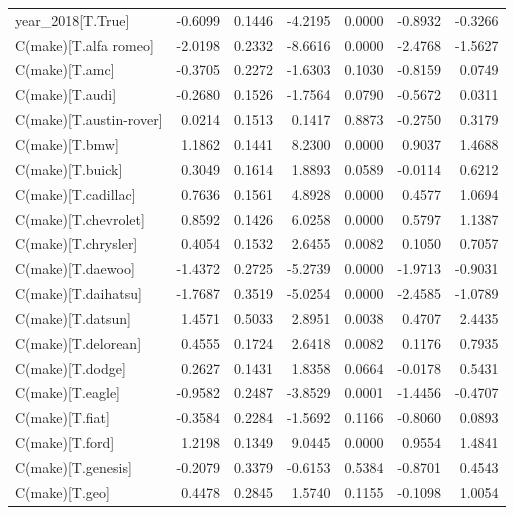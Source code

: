 \begin{table}
\begin{center}
\begin{tabular}{lrrrrrr}
year\_2018[T.True]       & -0.6099 &   0.1446 &  -4.2195 &      0.0000 & -0.8932 & -0.3266  \\
C(make)[T.alfa romeo]    & -2.0198 &   0.2332 &  -8.6616 &      0.0000 & -2.4768 & -1.5627  \\
C(make)[T.amc]           & -0.3705 &   0.2272 &  -1.6303 &      0.1030 & -0.8159 &  0.0749  \\
C(make)[T.audi]          & -0.2680 &   0.1526 &  -1.7564 &      0.0790 & -0.5672 &  0.0311  \\
C(make)[T.austin-rover]  &  0.0214 &   0.1513 &   0.1417 &      0.8873 & -0.2750 &  0.3179  \\
C(make)[T.bmw]           &  1.1862 &   0.1441 &   8.2300 &      0.0000 &  0.9037 &  1.4688  \\
C(make)[T.buick]         &  0.3049 &   0.1614 &   1.8893 &      0.0589 & -0.0114 &  0.6212  \\
C(make)[T.cadillac]      &  0.7636 &   0.1561 &   4.8928 &      0.0000 &  0.4577 &  1.0694  \\
C(make)[T.chevrolet]     &  0.8592 &   0.1426 &   6.0258 &      0.0000 &  0.5797 &  1.1387  \\
C(make)[T.chrysler]      &  0.4054 &   0.1532 &   2.6455 &      0.0082 &  0.1050 &  0.7057  \\
C(make)[T.daewoo]        & -1.4372 &   0.2725 &  -5.2739 &      0.0000 & -1.9713 & -0.9031  \\
C(make)[T.daihatsu]      & -1.7687 &   0.3519 &  -5.0254 &      0.0000 & -2.4585 & -1.0789  \\
C(make)[T.datsun]        &  1.4571 &   0.5033 &   2.8951 &      0.0038 &  0.4707 &  2.4435  \\
C(make)[T.delorean]      &  0.4555 &   0.1724 &   2.6418 &      0.0082 &  0.1176 &  0.7935  \\
C(make)[T.dodge]         &  0.2627 &   0.1431 &   1.8358 &      0.0664 & -0.0178 &  0.5431  \\
C(make)[T.eagle]         & -0.9582 &   0.2487 &  -3.8529 &      0.0001 & -1.4456 & -0.4707  \\
C(make)[T.fiat]          & -0.3584 &   0.2284 &  -1.5692 &      0.1166 & -0.8060 &  0.0893  \\
C(make)[T.ford]          &  1.2198 &   0.1349 &   9.0445 &      0.0000 &  0.9554 &  1.4841  \\
C(make)[T.genesis]       & -0.2079 &   0.3379 &  -0.6153 &      0.5384 & -0.8701 &  0.4543  \\
C(make)[T.geo]           &  0.4478 &   0.2845 &   1.5740 &      0.1155 & -0.1098 &  1.0054  \\

\end{tabular}
\end{center}
\end{table}
